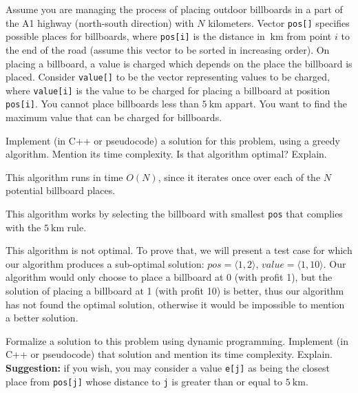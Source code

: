 {
\renewcommand{\thechapter}{\arabic{chapter}N}
\setcounter{chapter}{15}

Assume you are managing the process of placing outdoor billboards in a part of the A1 highway (north-south direction) with $N$ kilometers. Vector \texttt{pos[]} specifies possible places for billboards, where \texttt{pos[i]} is the distance in $\SI{}{\kilo\metre}$ from point $i$ to the end of the road (assume this vector to be sorted in increasing order). On placing a billboard, a value is charged which depends on the place the billboard is placed. Consider \texttt{value[]} to be the vector representing values to be charged, where \texttt{value[i]} is the value to be charged for placing a billboard at position \texttt{pos[i]}. You cannot place billboards less than $\SI{5}{\kilo\metre}$ appart. You want to find the maximum value that can be charged for billboards.

Implement (in C++ or pseudocode) a solution for this problem, using a greedy algorithm. Mention its time complexity. Is that algorithm optimal? Explain.

\ansseparator



This algorithm runs in time $O(N)$, since it iterates once over each of the $N$ potential billboard places.

This algorithm works by selecting the billboard with smallest \texttt{pos} that complies with the $\SI{5}{\kilo\metre}$ rule.

This algorithm is not optimal. To prove that, we will present a test case for which our algorithm produces a sub-optimal solution: $pos = \langle 1, 2 \rangle$, $value = \langle 1, 10 \rangle$. Our algorithm would only choose to place a billboard at 0 (with profit 1), but the solution of placing a billboard at 1 (with profit 10) is better, thus our algorithm has not found the optimal solution, otherwise it would be impossible to mention a better solution.

Formalize a solution to this problem using dynamic programming. Implement (in C++ or pseudocode) that solution and mention its time complexity. Explain.\\

\textbf{Suggestion:} if you wish, you may consider a value \texttt{e[j]} as being the closest place from \texttt{pos[j]} whose distance to \texttt{j} is greater than or equal to $\SI{5}{\kilo\metre}$.

}
